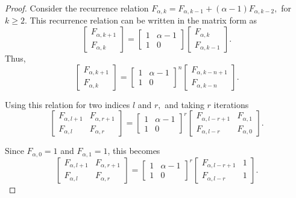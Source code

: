 \documentclass[11pt,oneside]{article}
\theoremstyle{plain}
\theoremstyle{plain}
\theoremstyle{definition}
\numberwithin{figure}{section}
\theoremstyle{remark}
\numberwithin{equation}{section}
\begin{document}
	\begin{proof} 
		Consider the recurrence relation $F_{\alpha,k} = F_{\alpha,k-1} + (\alpha-1)F_{\alpha,k-2},$ for $k \geq 2.$
		This recurrence relation can be written in the matrix form as
		\[
		\begin{bmatrix}
			F_{\alpha,k+1} \\
			F_{\alpha,k}
		\end{bmatrix}
		=
		\begin{bmatrix}
			1 & \alpha-1 \\
			1 & 0
		\end{bmatrix}
		\begin{bmatrix}
			F_{\alpha,k} \\
			F_{\alpha,k-1}
		\end{bmatrix}.
		\]
		Thus,
		\[
		\begin{bmatrix}
			F_{\alpha,k+1} \\
			F_{\alpha,k}
		\end{bmatrix}
		=
		\begin{bmatrix}
			1 & \alpha-1 \\
			1 & 0
		\end{bmatrix}^{n}
		\begin{bmatrix}
			F_{\alpha,k-n+1} \\
			F_{\alpha,k-n}
		\end{bmatrix}.
		\]
		
		Using this relation for two indices $l$ and $r,$ and taking $r$ iterations
		\[
		\begin{bmatrix}
			F_{\alpha,l+1} & F_{\alpha,r+1} \\
			F_{\alpha,l}   & F_{\alpha,r}
		\end{bmatrix}
		=
		\begin{bmatrix}
			1 & \alpha-1 \\
			1 & 0
		\end{bmatrix}^{r}
		\begin{bmatrix}
			F_{\alpha,l-r+1} & F_{\alpha,1} \\
			F_{\alpha,l-r}   & F_{\alpha,0}
		\end{bmatrix}.
		\]
		
		Since $F_{\alpha,0} = 1$ and $F_{\alpha,1} = 1$, this becomes
		\[
		\begin{bmatrix}
			F_{\alpha,l+1} & F_{\alpha,r+1} \\
			F_{\alpha,l}   & F_{\alpha,r}
		\end{bmatrix}
		=
		\begin{bmatrix}
			1 & \alpha-1 \\
			1 & 0
		\end{bmatrix}^{r}
		\begin{bmatrix}
			F_{\alpha,l-r+1} & 1 \\
			F_{\alpha,l-r}   & 1
		\end{bmatrix}.
		\]
		

\end{proof}
\end{document}
